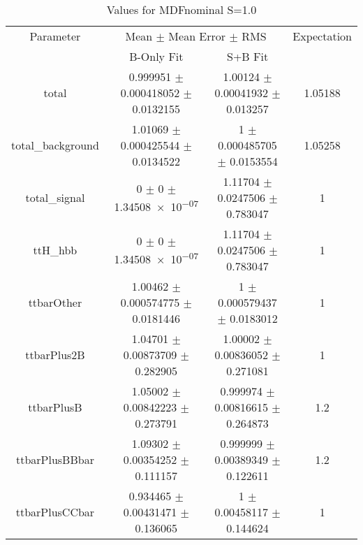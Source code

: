 \begin{table}
\centering
\caption{Values for MDFnominal S=1.0}
\begin{tabular}{cccc}
\toprule
Parameter & \multicolumn{2}{c}{Mean $\pm$ Mean Error $\pm$ RMS} & Expectation\\
 & B-Only Fit & S+B Fit & \\
\midrule
total & \num{0.999951} $\pm$ \num{0.000418052} $\pm$ \num{0.0132155} & \num{1.00124} $\pm$ \num{0.00041932} $\pm$ \num{0.013257} & \num{1.05188}\\
total\_background & \num{1.01069} $\pm$ \num{0.000425544} $\pm$ \num{0.0134522} & \num{1} $\pm$ \num{0.000485705} $\pm$ \num{0.0153554} & \num{1.05258}\\
total\_signal & \num{0} $\pm$ \num{0} $\pm$ \num{1.34508e-07} & \num{1.11704} $\pm$ \num{0.0247506} $\pm$ \num{0.783047} & \num{1}\\
ttH\_hbb & \num{0} $\pm$ \num{0} $\pm$ \num{1.34508e-07} & \num{1.11704} $\pm$ \num{0.0247506} $\pm$ \num{0.783047} & \num{1}\\
ttbarOther & \num{1.00462} $\pm$ \num{0.000574775} $\pm$ \num{0.0181446} & \num{1} $\pm$ \num{0.000579437} $\pm$ \num{0.0183012} & \num{1}\\
ttbarPlus2B & \num{1.04701} $\pm$ \num{0.00873709} $\pm$ \num{0.282905} & \num{1.00002} $\pm$ \num{0.00836052} $\pm$ \num{0.271081} & \num{1}\\
ttbarPlusB & \num{1.05002} $\pm$ \num{0.00842223} $\pm$ \num{0.273791} & \num{0.999974} $\pm$ \num{0.00816615} $\pm$ \num{0.264873} & \num{1.2}\\
ttbarPlusBBbar & \num{1.09302} $\pm$ \num{0.00354252} $\pm$ \num{0.111157} & \num{0.999999} $\pm$ \num{0.00389349} $\pm$ \num{0.122611} & \num{1.2}\\
ttbarPlusCCbar & \num{0.934465} $\pm$ \num{0.00431471} $\pm$ \num{0.136065} & \num{1} $\pm$ \num{0.00458117} $\pm$ \num{0.144624} & \num{1}\\
\bottomrule
\end{tabular}
\end{table}